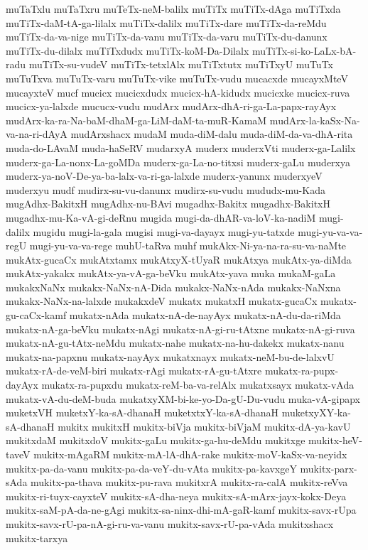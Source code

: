 {muTaTxlu
muTaTxru
muTeTx-neM-balilx
muTiTx
muTiTx-dAga
muTiTxda
muTiTx-daM-tA-ga-lilalx
muTiTx-dalilx
muTiTx-dare
muTiTx-da-reMdu
muTiTx-da-va-nige
muTiTx-da-vanu
muTiTx-da-varu
muTiTx-du-danunx
muTiTx-du-dilalx
muTiTxdudx
muTiTx-koM-Da-Dilalx
muTiTx-si-ko-LaLx-bA-radu
muTiTx-su-vudeV
muTiTx-tetxlAlx
muTiTxtutx
muTiTxyU
muTuTx
muTuTxva
muTuTx-varu
muTuTx-vike
muTuTx-vudu
mucacxde
mucayxMteV
mucayxteV
mucf
mucicx
mucicxdudx
mucicx-hA-kidudx
mucicxke
mucicx-ruva
mucicx-ya-lalxde
mucucx-vudu
mudArx
mudArx-dhA-ri-ga-La-papx-rayAyx
mudArx-ka-ra-Na-baM-dhaM-ga-LiM-daM-ta-muR-KamaM
mudArx-la-kaSx-Na-va-na-ri-dAyA
mudArxshacx
mudaM
muda-diM-dalu
muda-diM-da-va-dhA-rita
muda-do-LAvaM
muda-haSeRV
mudarxyA
muderx
muderxVti
muderx-ga-Lalilx
muderx-ga-La-nonx-La-goMDa
muderx-ga-La-no-titxsi
muderx-gaLu
muderxya
muderx-ya-noV-De-ya-ba-lalx-va-ri-ga-lalxde
muderx-yanunx
muderxyeV
muderxyu
mudf
mudirx-su-vu-danunx
mudirx-su-vudu
mududx-mu-Kada
mugAdhx-BakitxH
mugAdhx-nu-BAvi
mugadhx-Bakitx
mugadhx-BakitxH
mugadhx-mu-Ka-vA-gi-deRnu
mugida
mugi-da-dhAR-va-loV-ka-nadiM
mugi-dalilx
mugidu
mugi-la-gala
mugisi
mugi-va-dayayx
mugi-yu-tatxde
mugi-yu-va-va-regU
mugi-yu-va-va-rege
muhU-taRva
muhf
mukAkx-Ni-ya-na-ra-su-va-naMte
mukAtx-gucaCx
mukAtxtamx
mukAtxyX-tUyaR
mukAtxya
mukAtx-ya-diMda
mukAtx-yakakx
mukAtx-ya-vA-ga-beVku
mukAtx-yava
muka
mukaM-gaLa
mukakxNaNx
mukakx-NaNx-nA-Dida
mukakx-NaNx-nAda
mukakx-NaNxna
mukakx-NaNx-na-lalxde
mukakxdeV
mukatx
mukatxH
mukatx-gucaCx
mukatx-gu-caCx-kamf
mukatx-nAda
mukatx-nA-de-nayAyx
mukatx-nA-du-da-riMda
mukatx-nA-ga-beVku
mukatx-nAgi
mukatx-nA-gi-ru-tAtxne
mukatx-nA-gi-ruva
mukatx-nA-gu-tAtx-neMdu
mukatx-nahe
mukatx-na-hu-dakekx
mukatx-nanu
mukatx-na-papxnu
mukatx-nayAyx
mukatxnayx
mukatx-neM-bu-de-lalxvU
mukatx-rA-de-veM-biri
mukatx-rAgi
mukatx-rA-gu-tAtxre
mukatx-ra-pupx-dayAyx
mukatx-ra-pupxdu
mukatx-reM-ba-va-relAlx
mukatxsayx
mukatx-vAda
mukatx-vA-du-deM-buda
mukatxyXM-bi-ke-yo-Da-gU-Du-vudu
muka-vA-gipapx
muketxVH
muketxY-ka-sA-dhanaH
muketxtxY-ka-sA-dhanaH
muketxyXY-ka-sA-dhanaH
mukitx
mukitxH
mukitx-biVja
mukitx-biVjaM
mukitx-dA-ya-kavU
mukitxdaM
mukitxdoV
mukitx-gaLu
mukitx-ga-hu-deMdu
mukitxge
mukitx-heV-taveV
mukitx-mAgaRM
mukitx-mA-lA-dhA-rake
mukitx-moV-kaSx-va-neyidx
mukitx-pa-da-vanu
mukitx-pa-da-veY-du-vAta
mukitx-pa-kavxgeY
mukitx-parx-sAda
mukitx-pa-thava
mukitx-pu-rava
mukitxrA
mukitx-ra-calA
mukitx-reVva
mukitx-ri-tuyx-cayxteV
mukitx-sA-dha-neya
mukitx-sA-mArx-jayx-kokx-Deya
mukitx-saM-pA-da-ne-gAgi
mukitx-sa-ninx-dhi-mA-gaR-kamf
mukitx-savx-rUpa
mukitx-savx-rU-pa-nA-gi-ru-va-vanu
mukitx-savx-rU-pa-vAda
mukitxshacx
mukitx-tarxya
}
